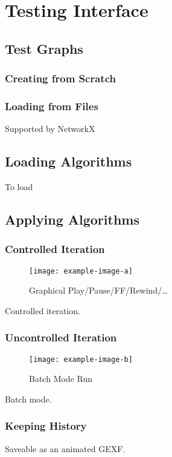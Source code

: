 \section{Testing Interface}
\label{sec:interface-testing}

\subsection{Test Graphs}
\subsubsection{Creating from Scratch}
\subsubsection{Loading from Files}
\label{sec:interface-testing:import}
Supported by NetworkX~\autocite{hagberg:networkx}

\subsection{Loading Algorithms} %
To load
\subsection{Applying Algorithms}
\subsubsection{Controlled Iteration}
\begin{figure}[p]
  \centering
  \texttt{[image: example-image-a]}
  \caption{Graphical Play\slash Pause\slash FF\slash Rewind\slash\dots}
  \label{fig:iface:alg-test-controlled}
\end{figure}
\begin{draftvspace}{.5in}
  Controlled iteration.
\end{draftvspace}
\subsubsection{Uncontrolled Iteration}
\begin{figure}[p]
  \centering
  \texttt{[image: example-image-b]}
  \caption{Batch Mode Run}
  \label{fig:iface:alg-test-batch}
\end{figure}
\begin{draftvspace}{.5in}
  Batch mode.
\end{draftvspace}
\subsubsection{Keeping History}
\begin{draftvspace}{.5in}
  Saveable as an animated GEXF.
\end{draftvspace}

